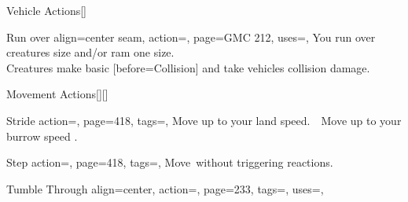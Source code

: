 \begin{PageBackLandscape}
\begin{TablesHalf}{\backTableHeight}
\begin{Table}{Vehicle Actions}[]
\begin{entry}{Run over}{%
                align=center seam,
                action=,
                page=GMC 212,
                uses={\Piloting[tags=R]},
            }
                You run over creatures  size and/or ram one  size. \hfill
                \\
                Creatures make basic [before=Collision] and take vehicles collision damage. \hfill
            \end{entry}
        \end{Table}
    \end{TablesHalf}%
    \begin{TablesHalf}{\backTableHeight}%
        \TableSpace
        \begin{Table}{Movement Actions}[][]
            \begin{entry}{Stride}{%
                action=,
                page=418,
                tags=\Move,
            }
                Move up to your land speed.\hfill
                \;\,\Move\,
                Move up to your burrow speed .
            \end{entry}
            \begin{entry}{Step}{%
                action=,
                page=418,
                tags=\Move,
            }
                Move \,\Feet without triggering reactions.
            \end{entry}
            \begin{entry}{Tumble Through}{%
                align=center,
                action=,
                page=233,
                tags=\Move,
                uses=\AcrobaticsReflex,
            }

\end{entry}
\end{Table}
\end{TablesHalf}
\end{PageBackLandscape}

